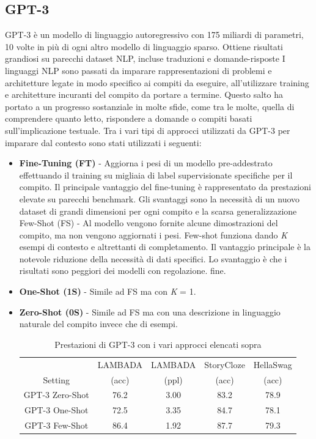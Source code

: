 \subsection{GPT-3}
GPT-3 è un modello di linguaggio autoregressivo con 175 miliardi di parametri, 10 volte in più di ogni altro modello di linguaggio sparso. Ottiene risultati grandiosi su parecchi dataset NLP, incluse traduzioni e domande-risposte\cite{brown2020language}
I linguaggi NLP sono passati da imparare rappresentazioni di problemi e architetture legate in modo specifico ai compiti da eseguire, all'utilizzare training e architetture incuranti del compito da portare a termine. Questo salto ha portato a un progresso sostanziale in molte sfide, come tra le molte, quella di comprendere quanto letto, rispondere a domande o compiti basati sull'implicazione testuale.
Tra i vari tipi di approcci utilizzati da GPT-3 per imparare dal contesto sono stati utilizzati i seguenti:
\begin{itemize}
\item {\textbf{Fine-Tuning (FT)}} - Aggiorna i pesi di un modello pre-addestrato effettuando il training su migliaia di label supervisionate specifiche per il compito. Il principale vantaggio del fine-tuning è rappresentato da prestazioni elevate su parecchi benchmark. Gli svantaggi sono la necessità di un nuovo dataset di grandi dimensioni per ogni compito e la scarsa generalizzazione\cite{https://doi.org/10.48550/arxiv.1902.01007}
Few-Shot (FS) - Al modello vengono fornite alcune dimostrazioni del compito, ma non vengono aggiornati i pesi. Few-shot funziona dando {\textit{K}} esempi di contesto e altrettanti di completamento. Il vantaggio principale è la notevole riduzione della necessità di dati specifici. Lo svantaggio è che i risultati sono peggiori dei modelli con regolazione. fine.\cite{brown2020language}
\item {\textbf{One-Shot (1S)}} - Simile ad FS ma con \textit{K} = 1.
\item {\textbf{Zero-Shot (0S)}} - Simile ad FS ma con una descrizione in linguaggio naturale del compito invece che di esempi.
\cite{brown2020language}
\begin{table}[h!]
\centering

\end{table}
\begin{table}[h!]
    \centering
     \begin{tabular}{||c c c c c||} 
     \hline
     & LAMBADA & LAMBADA & StoryCloze & HellaSwag \\ [0.5ex] 
     Setting & (acc) & (ppl) & (acc) & (acc) \\ [0.5ex] 
     \hline\hline
     GPT-3 Zero-Shot & 76.2 & 3.00 & 83.2 & 78.9 \\ 
     GPT-3 One-Shot & 72.5 & 3.35 & 84.7 & 78.1 \\
     GPT-3 Few-Shot & 86.4 & 1.92 & 87.7 & 79.3 \\ [1ex] 
     \hline
     \end{tabular}
    \caption{Prestazioni di GPT-3 con i vari approcci elencati sopra\cite{brown2020language}}
    \label{tab:table1}
\end{table}
\end{itemize}
